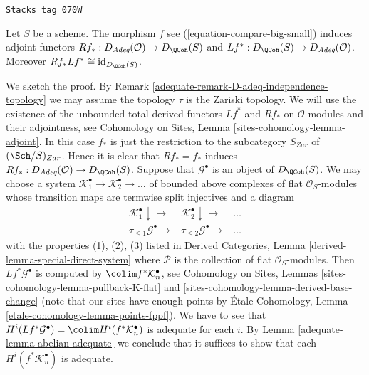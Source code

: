 \begin{remark}
\label{adequate-remark-D-adeq-and-D-QCoh}
\href{https://stacks.math.columbia.edu/tag/070W}{\texttt{Stacks tag 070W}}

Let $S$ be a scheme. The morphism $f$ see
(\ref{equation-compare-big-small}) induces
adjoint functors
$Rf_* : D_{\textit{Adeq}}(\mathcal{O}) \to D_\QCoh(S)$
and
$Lf^* : D_\QCoh(S) \to D_{\textit{Adeq}}(\mathcal{O})$.
Moreover $Rf_* Lf^* \cong \text{id}_{D_\QCoh(S)}$.

\medskip\noindent
We sketch the proof. By
Remark \ref{adequate-remark-D-adeq-independence-topology}
we may assume the topology $\tau$ is the Zariski topology.
We will use the existence of the unbounded total derived
functors $Lf^*$ and $Rf_*$ on $\mathcal{O}$-modules and their
adjointness, see
Cohomology on Sites, Lemma \ref{sites-cohomology-lemma-adjoint}.
In this case $f_*$ is just the restriction to the subcategory
$S_{Zar}$ of $(\Sch/S)_{Zar}$. Hence it is clear that
$Rf_* = f_*$ induces
$Rf_* : D_{\textit{Adeq}}(\mathcal{O}) \to D_\QCoh(S)$.
Suppose that $\mathcal{G}^\bullet$ is an object of
$D_\QCoh(S)$. We may choose a system
$\mathcal{K}_1^\bullet \to \mathcal{K}_2^\bullet \to \ldots$
of bounded above complexes of flat $\mathcal{O}_S$-modules whose
transition maps are termwise split injectives and a diagram
$$
\begin{array}{ccc}\mathcal{K}_1^\bullet \downarrow\longrightarrow & \mathcal{K}_2^\bullet \downarrow\longrightarrow & \ldots \\ \tau_{\leq 1}\mathcal{G}^\bullet \longrightarrow & \tau_{\leq 2}\mathcal{G}^\bullet \longrightarrow & \ldots\end{array}
$$
with the properties (1), (2), (3) listed in
Derived Categories, Lemma \ref{derived-lemma-special-direct-system}
where $\mathcal{P}$ is the collection of flat $\mathcal{O}_S$-modules.
Then $Lf^*\mathcal{G}^\bullet$ is computed by
$\colim f^*\mathcal{K}_n^\bullet$, see
Cohomology on Sites, Lemmas \ref{sites-cohomology-lemma-pullback-K-flat} and
\ref{sites-cohomology-lemma-derived-base-change}
(note that our sites have enough points by
\'Etale Cohomology, Lemma \ref{etale-cohomology-lemma-points-fppf}).
We have to see that $H^i(Lf^*\mathcal{G}^\bullet) =
\colim H^i(f^*\mathcal{K}_n^\bullet)$ is adequate for each $i$. By
Lemma \ref{adequate-lemma-abelian-adequate}
we conclude that it suffices to show that
each $H^i(f^*\mathcal{K}_n^\bullet)$ is adequate.


\end{remark}
